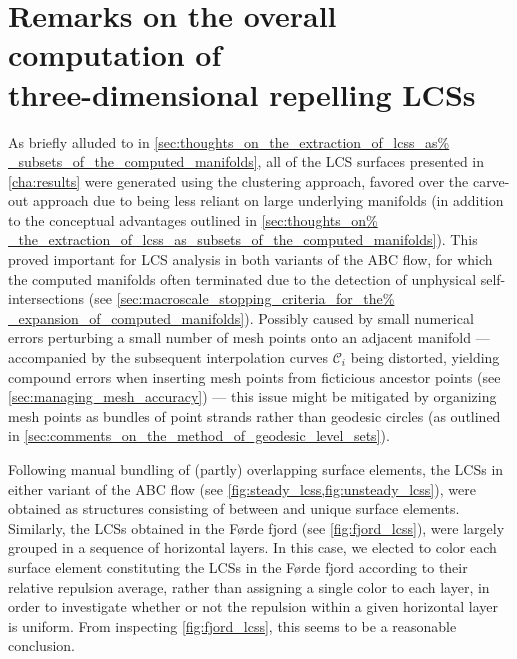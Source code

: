 \section[Remarks on the overall computation of three-dimensional repelling
LCSs]{Remarks on the overall computation of \\\phantom{5.5} three-dimensional
repelling LCSs}
\label{sec:remarks_on_the_overall_computation_of_three_dimensional_repelling_lcss}

As briefly alluded to in \cref{sec:thoughts_on_the_extraction_of_lcss_as%
_subsets_of_the_computed_manifolds}, all of the LCS surfaces presented in
\cref{cha:results} were generated using the clustering approach, favored over
the carve-out approach due to being less reliant on large underlying manifolds
(in addition to the conceptual advantages outlined in \cref{sec:thoughts_on%
_the_extraction_of_lcss_as_subsets_of_the_computed_manifolds}). This proved
important for LCS analysis in both variants of the ABC flow, for which the
computed manifolds often terminated due to the detection of unphysical
self-intersections (see \cref{sec:macroscale_stopping_criteria_for_the%
_expansion_of_computed_manifolds}). Possibly caused by small numerical errors
perturbing a small number of mesh points onto an adjacent manifold ---
accompanied by the subsequent interpolation curves $\mathcal{C}_{i}$ being
distorted, yielding compound errors when inserting mesh points from ficticious
ancestor points (see \cref{sec:managing_mesh_accuracy}) --- this issue might be
mitigated by organizing mesh points as bundles of point strands rather than
geodesic circles (as outlined in
\cref{sec:comments_on_the_method_of_geodesic_level_sets}).

Following manual bundling of (partly) overlapping surface elements, the LCSs in
either variant of the ABC flow (see \cref{fig:steady_lcss,fig:unsteady_lcss}),
were obtained as structures consisting of between  and
 unique surface elements. Similarly, the LCSs obtained in the
Førde fjord (see \cref{fig:fjord_lcss}), were largely grouped in a sequence of
horizontal layers. In this case, we elected to color each surface element
constituting the LCSs in the Førde fjord according to their relative repulsion
average, rather than assigning a single color to each layer, in order to
investigate whether or not the repulsion within a given horizontal layer is
uniform. From inspecting \cref{fig:fjord_lcss}, this seems to be a
reasonable conclusion.

